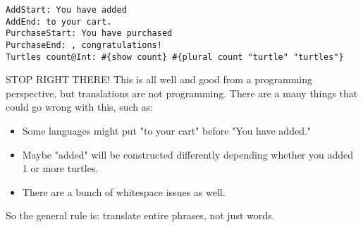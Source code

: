\begin{lstlisting}
AddStart: You have added
AddEnd: to your cart.
PurchaseStart: You have purchased
PurchaseEnd: , congratulations!
Turtles count@Int: #{show count} #{plural count "turtle" "turtles"}
\end{lstlisting}

STOP RIGHT THERE! This is all well and good from a programming perspective, but translations are not programming. There are a many things that could go wrong with this, such as:

\begin{itemize}
  \item Some languages might put "to your cart" before "You have added."
  \item Maybe "added" will be constructed differently depending whether you added 1 or more turtles.
  \item There are a bunch of whitespace issues as well.
\end{itemize}

So the general rule is: translate entire phrases, not just words.
